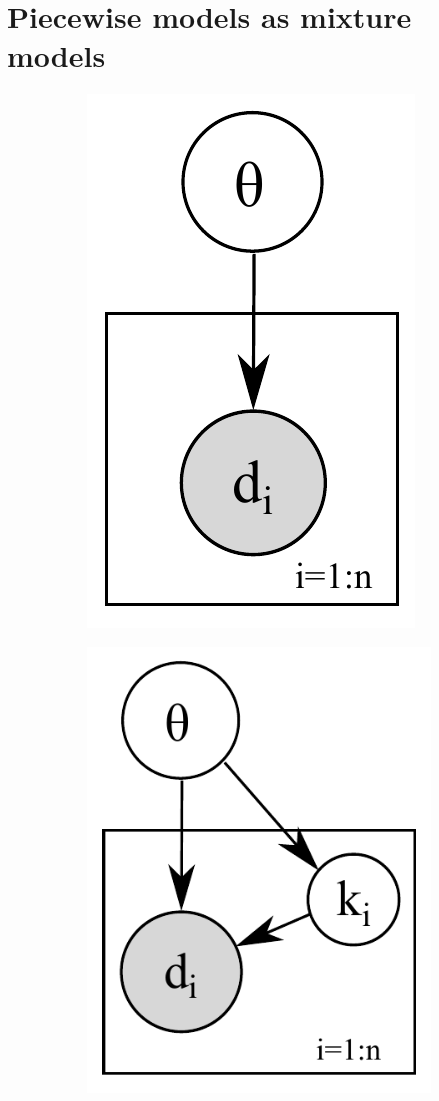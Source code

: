 \section{Piecewise models as mixture models}
\label{sect:mix}

\begin{figure}
\centering
\begin{subfigure}{.48\linewidth}
\centering
\includegraphics[width=.56\textwidth]{pic/naive.pdf}
\caption{}
\label{fig:naive}
\end{subfigure}
\begin{subfigure}{.48\linewidth}
\centering
  \includegraphics[width=.70\textwidth]{pic/naive-mix2.pdf}

\end{subfigure}
\end{figure}
